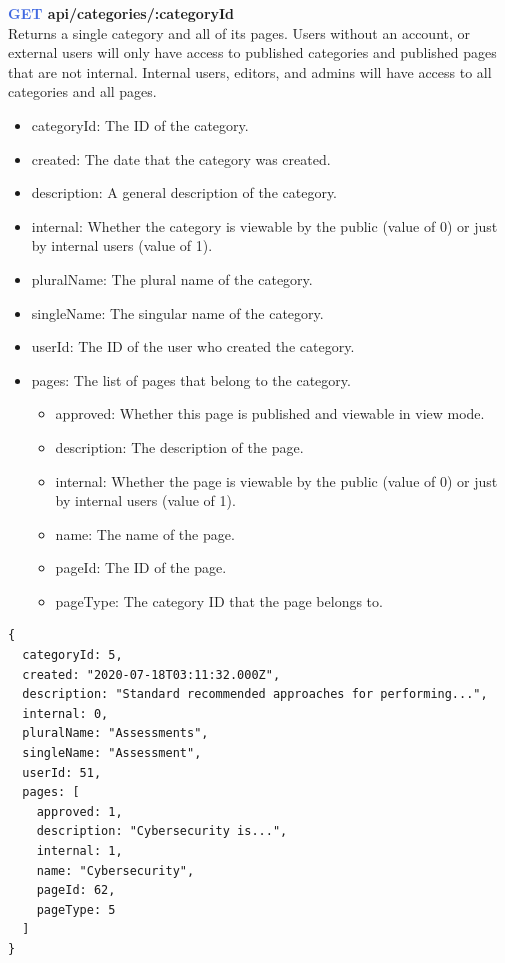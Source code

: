 \documentclass[onecolumn, draftclsnofoot,10pt, compsoc, usenames, dvipsnames]{IEEEtran}
\begin{document}
\noindent
\textbf{\textcolor{RoyalBlue}{GET} api/categories/:categoryId} \\
Returns a single category and all of its pages. Users without an account, or external users will only have access to published categories and published pages that are not internal. Internal users, editors, and admins will have access to all categories and all pages.
\begin{itemize}
    \item categoryId: The ID of the category.
    \item created: The date that the category was created.
    \item description: A general description of the category.
    \item internal: Whether the category is viewable by the public (value of 0) or just by internal users (value of 1).
    \item pluralName: The plural name of the category.
    \item singleName: The singular name of the category.
    \item userId: The ID of the user who created the category.
    \item pages: The list of pages that belong to the category.
    \begin{itemize}
        \item approved: Whether this page is published and viewable in view mode.
        \item description: The description of the page.
        \item internal: Whether the page is viewable by the public (value of 0) or just by internal users (value of 1).
        \item name: The name of the page.
        \item pageId: The ID of the page.
        \item pageType: The category ID that the page belongs to.
    \end{itemize}
\end{itemize}
\begin{lstlisting}[caption=Example Response]
{
  categoryId: 5,
  created: "2020-07-18T03:11:32.000Z",
  description: "Standard recommended approaches for performing...",
  internal: 0,
  pluralName: "Assessments",
  singleName: "Assessment",
  userId: 51,
  pages: [
    approved: 1,
    description: "Cybersecurity is...",
    internal: 1,
    name: "Cybersecurity",
    pageId: 62,
    pageType: 5
  ]
}
\end{lstlisting}
\\~\\
\end{document}
